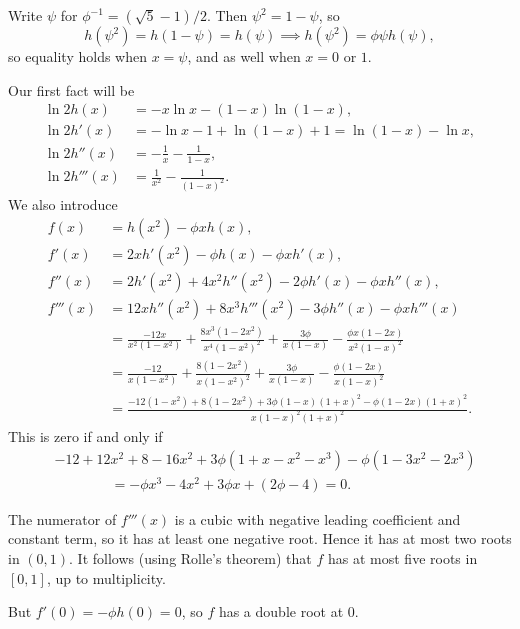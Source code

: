 \documentclass[12pt]{article}
\begin{document}
\begin{proofbox}
	Write $\psi$ for $\phi^{-1} = (\sqrt 5 - 1)/2$. Then $\psi^2 = 1 - \psi$, so
	\[
	h(\psi^2) = h(1 - \psi) = h(\psi) \implies h(\psi^2) = \phi \psi h(\psi),
	\]
	so equality holds when $x = \psi$, and as well when $x = 0$ or $1$.

	Our first fact will be
	\begin{align*}
		\ln 2 h(x) &= - x \ln x - (1 - x) \ln (1 - x), \\
	\ln 2 h'(x) &= - \ln x - 1 + \ln (1 - x) + 1 = \ln(1 - x) - \ln x, \\
	\ln 2 h''(x) &= - \frac 1x - \frac1{1-x}, \\
	\ln 2 h'''(x) &= \frac1{x^2} - \frac1{(1-x)^2}.
	\end{align*}
	We also introduce
	\begin{align*}
		f(x) &= h(x^2) - \phi xh(x), \\
		f'(x) &= 2 x h'(x^2) - \phi h(x) - \phi x h'(x), \\
		f''(x) &= 2 h'(x^2) + 4 x^2 h''(x^2) - 2 \phi h'(x) - \phi x h''(x), \\
		f'''(x) &= 12x h''(x^2) + 8 x^3 h'''(x^2) - 3 \phi h''(x) - \phi x h'''(x) \\
			&= \frac{- 12 x}{x^2(1 - x^2)} + \frac{8x^3(1 - 2x^2)}{x^{4}(1 - x^2)^2} + \frac{3 \phi}{x(1-x)} - \frac{\phi x(1-2x)}{x^2(1 - x)^2} \\
			&= \frac{-12}{x(1-x^2)} + \frac{8(1 - 2x^2)}{x(1 - x^2)^2} + \frac{3 \phi}{x(1-x)} - \frac{\phi (1-2x)}{x(1-x)^2} \\
			&= \frac{-12(1-x^2) + 8(1-2x^2) + 3 \phi(1 - x) (1 + x)^2 - \phi(1 - 2x)(1 + x)^2}{x(1-x)^2(1+x)^2}.
	\end{align*}
	This is zero if and only if
	\begin{align*}
	&-12 + 12 x^2 + 8 - 16x^2 + 3 \phi(1 + x - x^2 - x^3) - \phi(1 - 3x^2 - 2x^3) \\
	&\qquad \qquad = -\phi x^3 - 4x^2 + 3 \phi x + (2 \phi - 4) = 0.
	\end{align*}

	The numerator of $f'''(x)$ is a cubic with negative leading coefficient and constant term, so it has at least one negative root. Hence it has at most two roots in $(0, 1)$. It follows (using Rolle's theorem) that $f$ has at most five roots in $[0, 1]$, up to multiplicity.

	But $f'(0) = - \phi h(0) = 0$, so $f$ has a double root at $0$.


\end{proofbox}
\end{document}
